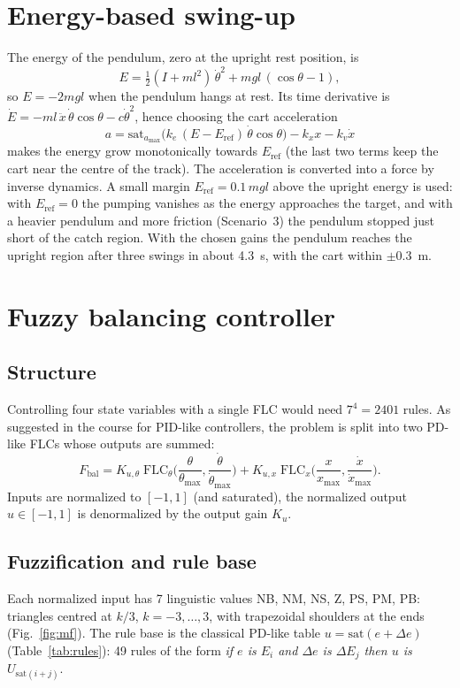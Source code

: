 \documentclass[11pt,a4paper]{article}
\begin{document}
\section{Energy-based swing-up}
The energy of the pendulum, zero at the upright rest position, is
\begin{equation}
E = \tfrac12 (I + m l^2)\,\dot\theta^2 + m g l\,(\cos\theta - 1),
\end{equation}
so $E = -2mgl$ when the pendulum hangs at rest. Its time derivative is $\dot E = -m l\,\ddot x\,\dot\theta\cos\theta - c\dot\theta^2$, hence choosing the cart acceleration
\begin{equation}
a = \mathrm{sat}_{a_{\max}}\!\big(k_e\,(E - E_\mathrm{ref})\,\dot\theta\cos\theta\big) - k_x x - k_v \dot x
\end{equation}
makes the energy grow monotonically towards $E_\mathrm{ref}$ (the last two terms keep the cart near the centre of the track). The acceleration is converted into a force by inverse dynamics. A small margin $E_\mathrm{ref} = 0.1\,mgl$ above the upright energy is used: with $E_\mathrm{ref} = 0$ the pumping vanishes as the energy approaches the target, and with a heavier pendulum and more friction (Scenario~3) the pendulum stopped just short of the catch region. With the chosen gains the pendulum reaches the upright region after three swings in about 4.3~s, with the cart within $\pm 0.3$~m.

\section{Fuzzy balancing controller}
\subsection{Structure}
Controlling four state variables with a single FLC would need $7^4 = 2401$ rules. As suggested in the course for PID-like controllers, the problem is split into two PD-like FLCs whose outputs are summed:
\begin{equation}
F_\mathrm{bal} = K_{u,\theta}\;\mathrm{FLC}_\theta\!\Big(\frac{\theta}{\theta_{\max}}, \frac{\dot\theta}{\dot\theta_{\max}}\Big) + K_{u,x}\;\mathrm{FLC}_x\!\Big(\frac{x}{x_{\max}}, \frac{\dot x}{\dot x_{\max}}\Big).
\end{equation}
Inputs are normalized to $[-1, 1]$ (and saturated), the normalized output $u\in[-1,1]$ is denormalized by the output gain $K_u$.

\subsection{Fuzzification and rule base}
Each normalized input has 7 linguistic values NB, NM, NS, Z, PS, PM, PB: triangles centred at $k/3$, $k = -3,\dots,3$, with trapezoidal shoulders at the ends (Fig.~\ref{fig:mf}). The rule base is the classical PD-like table $u = \mathrm{sat}(e + \Delta e)$ (Table~\ref{tab:rules}): 49 rules of the form
\emph{if $e$ is $E_i$ and $\Delta e$ is $\Delta E_j$ then $u$ is $U_{\mathrm{sat}(i+j)}$}.
\end{document}
